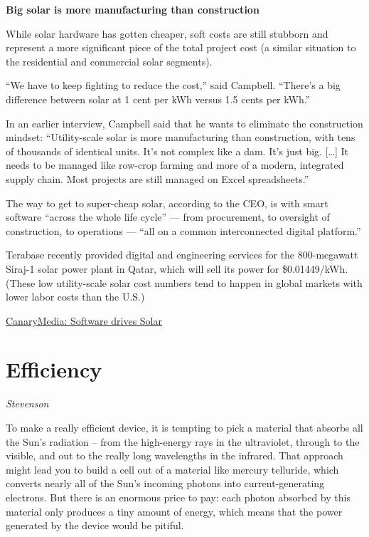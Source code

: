 \documentclass[
]{book}
\begin{document}
\textbf{Big solar is more manufacturing than construction}

While solar hardware has gotten cheaper, soft costs are still stubborn and represent a more significant piece of the total project cost (a similar situation to the residential and commercial solar segments).

``We have to keep fighting to reduce the cost,'' said Campbell. ``There's a big difference between solar at 1 cent per kWh versus 1.5 cents per kWh.''

In an earlier interview, Campbell said that he wants to eliminate the construction mindset: ``Utility-scale solar is more manufacturing than construction, with tens of thousands of identical units. It's not complex like a dam. It's just big. {[}\ldots{]} It needs to be managed like row-crop farming and more of a modern, integrated supply chain. Most projects are still managed on Excel spreadsheets.''

The way to get to super-cheap solar, according to the CEO, is with smart software ``across the whole life cycle'' --- from procurement, to oversight of construction, to operations --- ``all on a common interconnected digital platform.''

Terabase recently provided digital and engineering services for the 800-megawatt Siraj-1 solar power plant in Qatar, which will sell its power for \$0.01449/kWh. (These low utility-scale solar cost numbers tend to happen in global markets with lower labor costs than the U.S.)

\href{https://www.canarymedia.com/articles/software-will-eat-solar-driving-utility-scale-solar-prices-below-1-cent-per-kilowatt-hour-by-2025/}{CanaryMedia: Software drives Solar}

\hypertarget{efficiency}{%
\section{Efficiency}\label{efficiency}}

\emph{Stevenson}

To make a really efficient device, it is tempting to pick a material that absorbs all the Sun's radiation -- from the high-energy rays in the ultraviolet, through to the visible, and out to the really long wavelengths in the infrared. That approach might lead you to build a cell out of a material like mercury telluride, which converts nearly all of the Sun's incoming photons into current-generating electrons. But there is an enormous price to pay: each photon absorbed by this material only produces a tiny amount of energy, which means that the power generated by the device would be pitiful.
\end{document}
